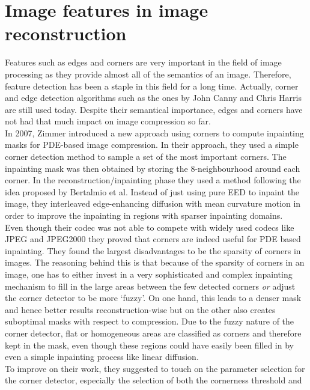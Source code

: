 \section{Image features in image reconstruction}
Features such as edges and corners are very important in the field of image processing as they
provide almost all of the semantics of an image\cite{marr82}. Therefore, feature detection has been a staple in
this field for a long time. Actually, corner and edge detection algorithms such as the ones by John Canny
and Chris Harris\cite{harris88, canny86} are still used today. 
Despite their semantical importance, edges and corners have not had that much impact on image
compression so far.\\

In 2007, Zimmer introduced a new approach using corners to compute inpainting masks for
PDE-based image compression\cite{zimmer07}. In their approach, they used a simple corner detection method to
sample a set of the most important corners. The inpainting mask was then obtained by storing the
8-neighbourhood around each corner. In the reconstruction/inpainting phase they used a method
following the idea proposed by Bertalmio et al\cite{bertalmio00}. Instead of just using pure EED to
inpaint the image, they interleaved edge-enhancing diffusion with mean curvature motion in order to
improve the inpainting in regions with sparser inpainting domains. \\
Even though their codec was
not able to compete with widely used codecs like JPEG and JPEG2000 they proved that corners are
indeed useful for PDE based inpainting. They found the largest disadvantages to be the sparsity of
corners in images. The reasoning behind this is that because of the sparsity of corners in an
image, one has to either invest in a very sophisticated and complex inpainting mechanism to fill in
the large areas between the few detected corners \textit{or} adjust the corner detector to be more
`fuzzy'. On one hand, this leads to a denser mask and hence better results reconstruction-wise 
but on the other also creates suboptimal masks with respect to compression. Due to the fuzzy nature of the
corner detector, flat or homogeneous areas are classified as corners and therefore kept in the
mask, even though these regions could have easily been filled in by even a simple inpainting
process like linear diffusion. \\
To improve on their work, they suggested to touch on the parameter
selection for the corner detector, especially the selection of both the cornerness threshold and
